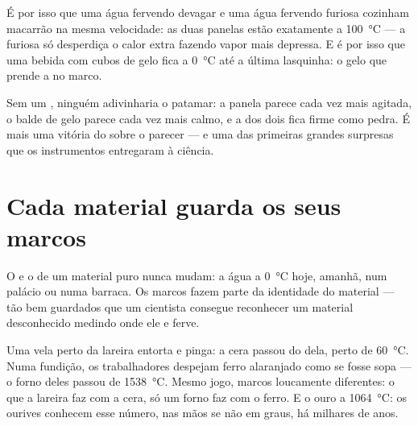 \begin{example}\label{ex:g4:changes-of-state:kitchen}
É por isso que uma água fervendo devagar e uma água fervendo furiosa
cozinham macarrão na mesma velocidade: as duas panelas estão
exatamente a \qty{100}{\celsius} --- a furiosa só desperdiça o calor
extra fazendo vapor mais depressa. E é por isso que uma bebida com
cubos de gelo fica a \qty{0}{\celsius} até a última lasquinha: o gelo
que  prende a  no marco.
\end{example}

\begin{remark}\label{rem:g4:changes-of-state:invisible}
Sem um , ninguém adivinharia o patamar: a panela parece
cada vez mais agitada, o balde de gelo parece cada vez mais calmo, e
a  dos dois fica firme como pedra. É mais uma vitória do
 sobre o parecer --- e uma das primeiras grandes surpresas que
os instrumentos entregaram à ciência.
\end{remark}

\section{Cada material guarda os seus marcos}

\begin{proposition}\label{prop:g4:changes-of-state:identity}
O  e o  de um material puro nunca
mudam: a água  a \qty{0}{\celsius} hoje, amanhã, num palácio
ou numa barraca. Os marcos fazem parte da identidade do material ---
tão bem guardados que um cientista consegue reconhecer um material
desconhecido medindo onde ele  e ferve.
\end{proposition}

\begin{example}\label{ex:g4:changes-of-state:foundry}
Uma vela perto da lareira entorta e pinga: a cera passou do  dela, perto de \qty{60}{\celsius}. Numa fundição, os
trabalhadores despejam ferro  alaranjado como se fosse sopa
--- o forno deles passou de \qty{1538}{\celsius}. Mesmo jogo, marcos
loucamente diferentes: o que a lareira faz com a cera, só um forno
faz com o ferro. E o ouro  a \qty{1064}{\celsius}: os ourives
conhecem esse número, nas mãos se não em graus, há milhares de anos.
\end{example}

